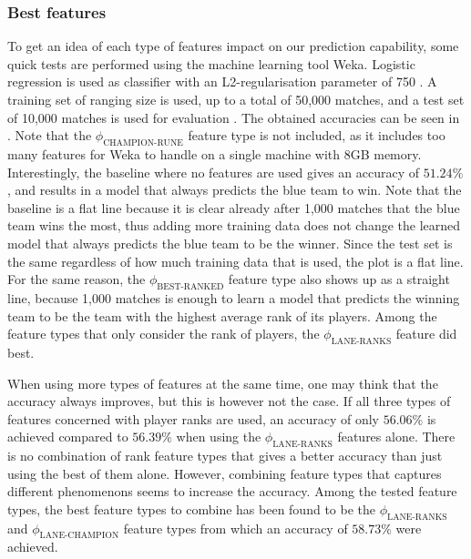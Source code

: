 \subsubsection{Best features}
\label{sec:best-features}
To get an idea of each type of features impact on our prediction capability, some quick tests are performed using the machine learning tool Weka.
Logistic regression is used as classifier with an L2-regularisation parameter of 750 . A training set of ranging size is used, up to a total of 50,000 matches, and a test set of 10,000 matches is used for evaluation . 
The obtained accuracies can be seen in . Note that the $\phi_\text{CHAMPION-RUNE}$ feature type is not included, as it includes too many features for Weka to handle on a single machine with 8GB memory.
Interestingly, the baseline where no features are used gives an accuracy of $51.24 \%$, and results in a model that always predicts the blue team to win.
Note that the baseline is a flat line because it is clear already after 1,000 matches that the blue team wins the most, thus adding more training data does not change the learned model that always predicts the blue team to be the winner. Since the test set is the same regardless of how much training data that is used, the plot is a flat line. For the same reason, the $\phi_\text{BEST-RANKED}$ feature type also shows up as a straight line, because 1,000 matches is enough to learn a model that predicts the winning team to be the team with the highest average rank of its players.
Among the feature types that only consider the rank of players, the $\phi_\text{LANE-RANKS}$ feature did best.

When using more types of features at the same time, one may think that the accuracy always improves, but this is however not the case.
If all three types of features concerned with player ranks are used, an accuracy of only $56.06\%$ is achieved compared to $56.39\%$ when using the $\phi_\text{LANE-RANKS}$ features alone. There is no combination of rank feature types that gives a better accuracy than just using the best of them alone.
However, combining feature types that captures different phenomenons seems to increase the accuracy.
Among the tested feature types, the best feature types to combine has been found to be the $\phi_\text{LANE-RANKS}$ and $\phi_\text{LANE-CHAMPION}$ feature types from which an accuracy of $58.73 \%$ were achieved.

